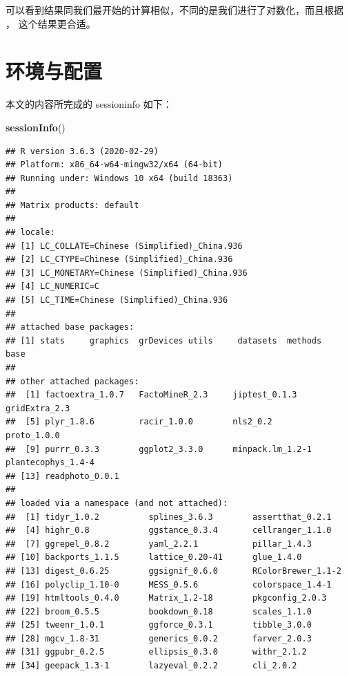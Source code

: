 \documentclass[
]{krantz}
\makeatletter
\newenvironment{Shaded}{\begin{snugshade}}{\end{snugshade}}
\newcommand{\KeywordTok}[1]{\textcolor[rgb]{0.13,0.29,0.53}{\textbf{#1}}}
\newcommand{\NormalTok}[1]{#1}
\newenvironment{kframe}{%
\medskip{}
\setlength{\fboxsep}{.8em}
 \def\at@end@of@kframe{}%
 \ifinner\ifhmode%
  \def\at@end@of@kframe{\end{minipage}}%
  \begin{minipage}{\columnwidth}%
 \fi\fi%
 \def\FrameCommand##1{\hskip\@totalleftmargin \hskip-\fboxsep
 \colorbox{shadecolor}{##1}\hskip-\fboxsep
     \hskip-\linewidth \hskip-\@totalleftmargin \hskip\columnwidth}%
 \MakeFramed {\advance\hsize-\width
   \@totalleftmargin\z@ \linewidth\hsize
   \@setminipage}}%
 {\par\unskip\endMakeFramed%
 \at@end@of@kframe}
\renewenvironment{Shaded}{\begin{kframe}}{\end{kframe}}
\makeatother
\begin{document}
可以看到结果同我们最开始的计算相似，不同的是我们进行了对数化，而且根据 \citet{kemp2003modern}， 这个结果更合适。

\hypertarget{sessioninfo}{%
\chapter{环境与配置}\label{sessioninfo}}

本文的内容所完成的 sessioninfo 如下：

\begin{Shaded}
\begin{Highlighting}[]
\KeywordTok{sessionInfo}\NormalTok{()}
\end{Highlighting}
\end{Shaded}

\begin{verbatim}
## R version 3.6.3 (2020-02-29)
## Platform: x86_64-w64-mingw32/x64 (64-bit)
## Running under: Windows 10 x64 (build 18363)
## 
## Matrix products: default
## 
## locale:
## [1] LC_COLLATE=Chinese (Simplified)_China.936 
## [2] LC_CTYPE=Chinese (Simplified)_China.936   
## [3] LC_MONETARY=Chinese (Simplified)_China.936
## [4] LC_NUMERIC=C                              
## [5] LC_TIME=Chinese (Simplified)_China.936    
## 
## attached base packages:
## [1] stats     graphics  grDevices utils     datasets  methods   base     
## 
## other attached packages:
##  [1] factoextra_1.0.7   FactoMineR_2.3     jiptest_0.1.3      gridExtra_2.3     
##  [5] plyr_1.8.6         racir_1.0.0        nls2_0.2           proto_1.0.0       
##  [9] purrr_0.3.3        ggplot2_3.3.0      minpack.lm_1.2-1   plantecophys_1.4-4
## [13] readphoto_0.0.1   
## 
## loaded via a namespace (and not attached):
##  [1] tidyr_1.0.2          splines_3.6.3        assertthat_0.2.1    
##  [4] highr_0.8            ggstance_0.3.4       cellranger_1.1.0    
##  [7] ggrepel_0.8.2        yaml_2.2.1           pillar_1.4.3        
## [10] backports_1.1.5      lattice_0.20-41      glue_1.4.0          
## [13] digest_0.6.25        ggsignif_0.6.0       RColorBrewer_1.1-2  
## [16] polyclip_1.10-0      MESS_0.5.6           colorspace_1.4-1    
## [19] htmltools_0.4.0      Matrix_1.2-18        pkgconfig_2.0.3     
## [22] broom_0.5.5          bookdown_0.18        scales_1.1.0        
## [25] tweenr_1.0.1         ggforce_0.3.1        tibble_3.0.0        
## [28] mgcv_1.8-31          generics_0.0.2       farver_2.0.3        
## [31] ggpubr_0.2.5         ellipsis_0.3.0       withr_2.1.2         
## [34] geepack_1.3-1        lazyeval_0.2.2       cli_2.0.2           

\end{verbatim}
\end{document}
